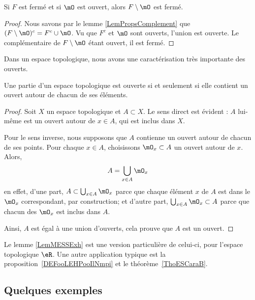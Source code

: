\begin{lemma}       \label{LEMooSFMZooBguLdf}
    Si \( F\) est fermé et si \( \mO\) est ouvert, alors \( F\setminus \mO \) est fermé.
\end{lemma}

\begin{proof}
    Nous savons par le lemme \ref{LemPropsComplement} que $(F\setminus \mO)^c=F^c\cup\mO$. Vu que \( F^c\) et \( \mO\) sont ouverts, l'union est ouverte. Le complémentaire de \( F\setminus \mO\) étant ouvert, il est fermé.
\end{proof}

Dans un espace topologique, nous avons une caractérisation très importante des ouverts.
\begin{theorem}		\label{ThoPartieOUvpartouv}
	Une partie d'un espace topologique est ouverte si et seulement si elle contient un ouvert autour de chacun de ses éléments.
\end{theorem}

\begin{proof}
	Soit \( X\) un espace topologique et \( A\subset X\). Le sens direct est évident : \( A\) lui-même est un ouvert autour de \( x\in A\), qui est inclus dans \( X\).

	Pour le sens inverse, nous supposons que \( A\) contienne un ouvert autour de chacun de ses points. Pour chaque \( x\in A\), choisissons \( \mO_x\subset A\) un ouvert autour de \( x\). Alors,
	\begin{equation}	\label{EqAUniondesOx}
		A=\bigcup_{x\in A}\mO_x
	\end{equation}
	en effet, d'une part, \( A\subset\bigcup_{x\in A}\mO_x\) parce que chaque élément \( x\) de \( A\) est dans le \( \mO_x\) correspondant, par construction; et d'autre part, \( \bigcup_{x\in A}\mO_x\subset A\) parce que chacun des \( \mO_x\) est inclus dans \( A\).

	Ainsi, \( A\) est égal à une union d'ouverts, cela prouve que \( A\) est un ouvert.
\end{proof}
Le lemme \ref{LemMESSExh} est une version particulière de celui-ci, pour l'espace topologique \( \eR \). Une autre application typique est la proposition~\ref{DEFooLEHPooIlNmpi} et le théorème~\ref{ThoESCaraB}.

\subsection{Quelques exemples}

